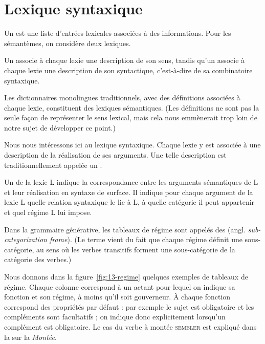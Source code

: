 \section{Lexique syntaxique}\largerpage[2]
Un  est une liste d’entrées lexicales associées à des informations. Pour les sémantèmes, on considère deux lexiques.

{Un  associe à chaque lexie une description de son sens, tandis qu’un  associe à chaque lexie une description de son syntactique, c'est-à-dire de sa combinatoire syntaxique.}

Les dictionnaires monolingues traditionnels, avec des définitions associées à chaque lexie, constituent des lexiques sémantiques. (Les définitions ne sont pas la seule façon de représenter le sens lexical, mais cela nous emmènerait trop loin de notre sujet de développer ce point.) 

Nous nous intéressons ici au lexique syntaxique. Chaque lexie y est associée à une description de la réalisation de ses arguments. Une telle description est traditionnellement appelée un .%

{Un  de la lexie L indique la correspondance entre les arguments sémantiques de L et leur réalisation en syntaxe de surface. Il indique pour chaque argument de la lexie L quelle relation syntaxique le lie à L, à quelle catégorie il peut appartenir et quel régime L lui impose.}

Dans la grammaire générative, les tableaux de régime sont appelés des  (angl. \textit{sub-categorization frame}). (Le terme vient du fait que chaque régime définit une sous-catégorie, au sens où les verbes transitifs forment une sous-catégorie de la catégorie des verbes.)

Nous donnons dans la figure~\ref{fig:13-regime} quelques exemples de tableaux de régime. Chaque colonne correspond à un actant pour lequel on indique sa fonction et son régime, à moins qu'il soit gouverneur. À chaque fonction correspond des propriétés par défaut : par exemple le sujet est obligatoire et les compléments sont facultatifs ; on indique donc explicitement lorsqu'un complément est obligatoire. Le cas du verbe à montée \textsc{sembler} est expliqué dans la  sur la \textit{Montée}.

